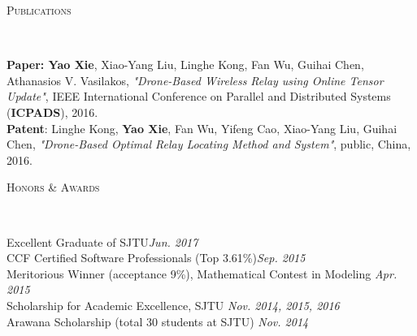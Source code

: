 \documentclass[10pt]{article}
\newenvironment{changemargin}[2]{%
  \begin{list}{}{%
    \setlength{\topsep}{0pt}%
    \setlength{\leftmargin}{#1}%
    \setlength{\rightmargin}{#2}%
    \setlength{\listparindent}{\parindent}%
    \setlength{\itemindent}{\parindent}%
    \setlength{\parsep}{\parskip}%
  }%
  \item[]}{\end{list}
}
\newcommand{\lineover}{
	\begin{changemargin}{-0.05in}{-0.05in}
		\vspace*{-8pt}
		\hrulefill \\
		\vspace*{-2pt}
	\end{changemargin}
}
\newcommand{\header}[1]{
	\begin{changemargin}{-0.7in}{-0.65in}
		\scshape{\large{#1}}\\
  	\lineover
	\end{changemargin}
}
\newenvironment{body} {
	\vspace*{-16pt}
	\begin{changemargin}{-0.65in}{-0.62in}
  }	
	{\end{changemargin}
}
\begin{document}
\smallskip
\vspace{-8pt}

\header{Publications}

\begin{body}
	\vspace{14pt}
	
\textbf{Paper: Yao Xie}, Xiao-Yang Liu, Linghe Kong, Fan Wu, Guihai Chen, Athanasios V. Vasilakos, \textit{"Drone-Based Wireless Relay using Online Tensor Update"}, IEEE International Conference on Parallel and Distributed Systems (\textbf{ICPADS}), 2016.\\
\textbf{Patent}: Linghe Kong, \textbf{Yao Xie}, Fan Wu, Yifeng Cao, Xiao-Yang Liu, Guihai Chen, \textit{"Drone-Based Optimal Relay Locating Method and System"}, public, China, 2016.

\end{body}

\smallskip
\smallskip
\vspace{-8pt}

\header{Honors \& Awards}

\begin{body}
	\vspace{14pt}

	Excellent Graduate of SJTU\hfill \emph{Jun. 2017}\\
	
	CCF Certified Software Professionals (Top 3.61\%)\hfill \emph{Sep. 2015}\\


	Meritorious Winner (acceptance 9\%), Mathematical Contest in Modeling  \hfill  \emph{Apr. 2015}\\
	
	Scholarship for Academic Excellence, SJTU \hfill \emph{Nov. 2014, 2015, 2016}\\
	
	Arawana Scholarship (total 30 students at SJTU) \hfill \emph{Nov. 2014}
	

\end{body}
\end{document}
